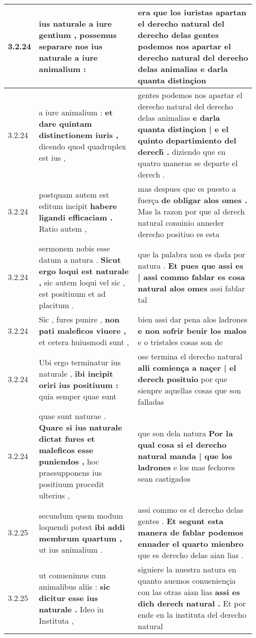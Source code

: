 \begin{tabular}{|p{1cm}|p{6.5cm}|p{6.5cm}|}
3.2.24 & ius naturale a iure gentium , \textbf{ possemus separare nos ius naturale } a iure animalium : & era que los iuristas apartan el derecho natural del derecho delas \textbf{ gentes podemos nos apartar el derecho natural del derecho delas animalias } e darla quanta distinçion \\\hline
3.2.24 & a iure animalium : \textbf{ et dare quintam distinctionem iuris , } dicendo quod quadruplex est ius , & gentes podemos nos apartar el derecho natural del derecho delas animalias \textbf{ e darla quanta distinçion | e el quinto departimiento del derech̃ . } diziendo que en quatro maneras se departe el derech . \\\hline
3.2.24 & postquam autem est editum incipit \textbf{ habere ligandi efficaciam . } Ratio autem , & mas despues que es puesto a fuerça \textbf{ de obligar alos omes . } Mas la razon por que al derech natural conuinio anneder derecho positiuo es esta \\\hline
3.2.24 & sermonem nobis esse datum a natura . \textbf{ Sicut ergo loqui est naturale , } sic autem loqui vel sic , est positiuum et ad placitum . & que la palabra non es dada por natura . \textbf{ Et pues que assi es | assi commo fablar es cosa natural alos omes } assi fablar tal \\\hline
3.2.24 & Sic , fures punire , \textbf{ non pati maleficos viuere , } et cetera huiusmodi sunt , & bien assi dar pena alos ladrones \textbf{ e non sofrir beuir los malos } e o tristales cosas son de \\\hline
3.2.24 & Ubi ergo terminatur ius naturale , \textbf{ ibi incipit oriri ius positiuum : } quia semper quae sunt & ose termina el derecho natural \textbf{ alli comiença a naçer | el derech posituio } por que sienpre aquellas cosas que son falladas \\\hline
3.2.24 & quae sunt naturae . \textbf{ Quare si ius naturale dictat fures et maleficos esse puniendos , } hoc praesupponens ius positiuum procedit ulterius , & que son dela natura \textbf{ Por la qual cosa si el derecho natural manda | que los ladrones } e los mas fechores sean castigados \\\hline
3.2.25 & secundum quem modum loquendi potest \textbf{ ibi addi membrum quartum , } ut ius animalium . & assi commo es el derecho delas gentes . \textbf{ Et segunt esta manera de fablar podemos ennader el quarto mienbro } que es derecho delas aian lias . \\\hline
3.2.25 & ut conuenimus cum animalibus aliis : \textbf{ sic dicitur esse ius naturale . } Ideo in Instituta , & siguiere la nuestra natura en quanto auemos conueniençia con las otras aian lias \textbf{ assi es dich derech natural . } Et por ende en la instituta del derecho natural \\\hline

\end{tabular}
